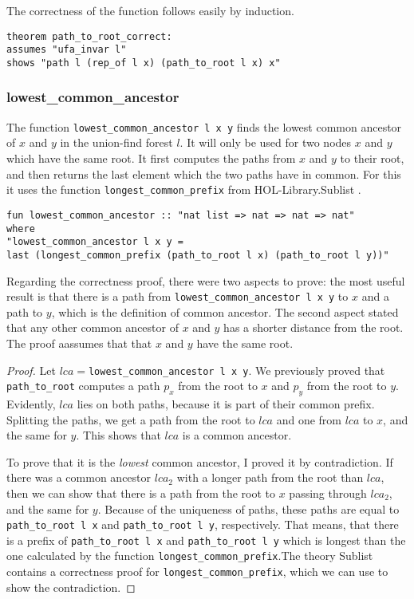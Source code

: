 The correctness of the function follows easily by induction.

\begin{lstlisting}
theorem path_to_root_correct:
assumes "ufa_invar l"
shows "path l (rep_of l x) (path_to_root l x) x"
\end{lstlisting}

\subsubsection{lowest\_common\_ancestor}

The function \lstinline{lowest_common_ancestor l x y} finds the lowest common ancestor of $x$ and $y$ in the union-find forest $l$. It will only be used for two nodes $x$ and $y$ which have the same root. It first computes the paths from $x$ and $y$ to their root, and then returns the last element which the two paths have in common. For this it uses the function \lstinline{longest_common_prefix} from HOL-Library.Sublist \cite{Sublist}.

\begin{lstlisting}
fun lowest_common_ancestor :: "nat list => nat => nat => nat" 
where
"lowest_common_ancestor l x y = 
last (longest_common_prefix (path_to_root l x) (path_to_root l y))"
\end{lstlisting}

Regarding the correctness proof, there were two aspects to prove: the most useful result is that there is a path from \lstinline{lowest_common_ancestor l x y} to $x$ and a path to $y$, which is the definition of common ancestor. The second aspect stated that any other common ancestor of $x$ and $y$ has a shorter distance from the root. The proof aassumes that that $x$ and $y$ have the same root.

\begin{proof}
Let $lca =$\lstinline{lowest_common_ancestor l x y}. We previously proved that \lstinline{path_to_root} computes a path $p_x$ from the root to $x$ and $p_y$ from the root to $y$. Evidently, $lca$ lies on both paths, because it is part of their common prefix. Splitting the paths, we get a path from the root to $lca$ and one from $lca$ to $x$, and the same for $y$. This shows that $lca$ is a common ancestor. 

To prove that it is the \emph{lowest} common ancestor, I proved it by contradiction. If there was a common ancestor $lca_2$ with a longer path from the root than $lca$, then we can show that there is a path from the root to $x$ passing through $lca_2$, and the same for $y$. Because of the uniqueness of paths, these paths are equal to \lstinline{path_to_root l x} and \lstinline{path_to_root l y}, respectively. That means, that there is a prefix of \lstinline{path_to_root l x} and \lstinline{path_to_root l y} which is longest than the one calculated by the function \lstinline{longest_common_prefix}.The theory Sublist\cite{Sublist} contains a correctness proof for \lstinline{longest_common_prefix}, which we can use to show the contradiction.
\end{proof}

